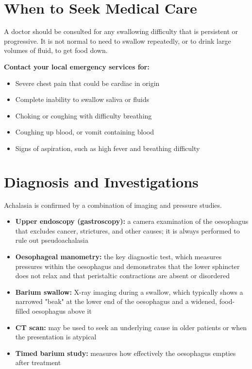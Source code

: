 \section*{When to Seek Medical Care}
A doctor should be consulted for any swallowing difficulty that is persistent or progressive. It is not normal to need to swallow repeatedly, or to drink large volumes of fluid, to get food down.

\textbf{Contact your local emergency services for:}
\begin{itemize}
    \item Severe chest pain that could be cardiac in origin
    \item Complete inability to swallow saliva or fluids
    \item Choking or coughing with difficulty breathing
    \item Coughing up blood, or vomit containing blood
    \item Signs of aspiration, such as high fever and breathing difficulty
\end{itemize}

\section*{Diagnosis and Investigations}
Achalasia is confirmed by a combination of imaging and pressure studies.

\begin{itemize}
    \item \textbf{Upper endoscopy (gastroscopy):} a camera examination of the oesophagus that excludes cancer, strictures, and other causes; it is always performed to rule out pseudoachalasia
    \item \textbf{Oesophageal manometry:} the key diagnostic test, which measures pressures within the oesophagus and demonstrates that the lower sphincter does not relax and that peristaltic contractions are absent or disordered
    \item \textbf{Barium swallow:} X-ray imaging during a swallow, which typically shows a narrowed "beak" at the lower end of the oesophagus and a widened, food-filled oesophagus above it
    \item \textbf{CT scan:} may be used to seek an underlying cause in older patients or when the presentation is atypical
    \item \textbf{Timed barium study:} measures how effectively the oesophagus empties after treatment
\end{itemize}

